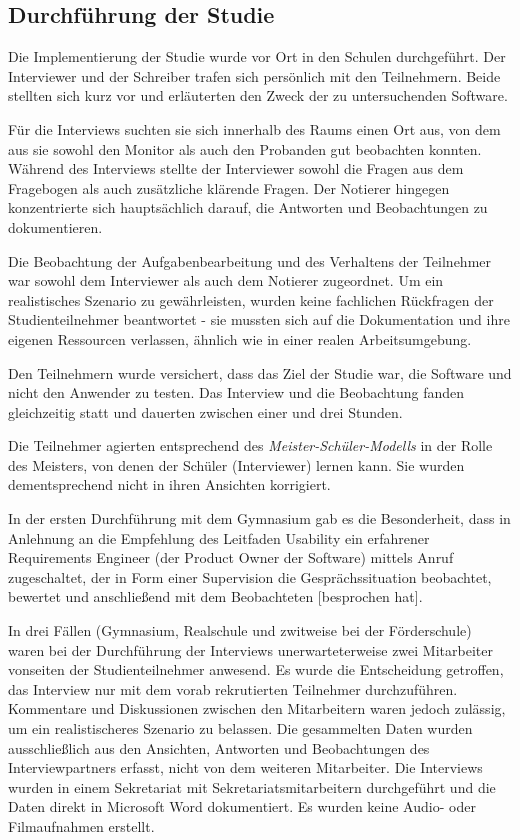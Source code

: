 \subsection{Durchführung der Studie}

Die Implementierung der Studie wurde vor Ort in den Schulen durchgeführt. Der Interviewer und der Schreiber trafen sich persönlich mit den Teilnehmern. Beide stellten sich kurz vor und erläuterten den Zweck der zu untersuchenden Software.

Für die Interviews suchten sie sich innerhalb des Raums einen Ort aus, von dem aus sie sowohl den Monitor als auch den Probanden gut beobachten konnten. Während des Interviews stellte der Interviewer sowohl die Fragen aus dem Fragebogen als auch zusätzliche klärende Fragen. Der Notierer hingegen konzentrierte sich hauptsächlich darauf, die Antworten und Beobachtungen zu dokumentieren.

Die Beobachtung der Aufgabenbearbeitung und des Verhaltens der Teilnehmer war sowohl dem Interviewer als auch dem Notierer zugeordnet. Um ein realistisches Szenario zu gewährleisten, wurden keine fachlichen Rückfragen der Studienteilnehmer beantwortet - sie mussten sich auf die Dokumentation und ihre eigenen Ressourcen verlassen, ähnlich wie in einer realen Arbeitsumgebung.

Den Teilnehmern wurde versichert, dass das Ziel der Studie war, die Software und nicht den Anwender zu testen. Das Interview und die Beobachtung fanden gleichzeitig statt und dauerten zwischen einer und drei Stunden.

Die Teilnehmer agierten entsprechend des \textit{Meister-Schüler-Modells} in der Rolle des Meisters, von denen der Schüler (Interviewer) lernen kann. Sie wurden dementsprechend nicht in ihren Ansichten korrigiert. %

In der ersten Durchführung mit dem Gymnasium gab es die Besonderheit, dass  in Anlehnung an die Empfehlung des Leitfaden Usability ein erfahrener Requirements Engineer (der Product Owner der Software) mittels Anruf zugeschaltet, der \glqq in Form einer Supervision die Gesprächssituation beobachtet, bewertet und anschließend mit dem Beobachteten [besprochen hat]\grqq{}\cite[p.~133]{dakks}.

In drei Fällen (Gymnasium, Realschule und zwitweise bei der Förderschule) waren bei der Durchführung der Interviews unerwarteterweise zwei Mitarbeiter vonseiten der Studienteilnehmer anwesend. Es wurde die Entscheidung getroffen, das Interview nur mit dem vorab rekrutierten Teilnehmer durchzuführen. Kommentare und Diskussionen zwischen den Mitarbeitern waren jedoch zulässig, um ein realistischeres Szenario zu belassen. Die gesammelten Daten wurden ausschließlich aus den Ansichten, Antworten und Beobachtungen des Interviewpartners erfasst, nicht von dem weiteren Mitarbeiter. Die Interviews wurden in einem Sekretariat mit Sekretariatsmitarbeitern durchgeführt und die Daten direkt in Microsoft Word dokumentiert. Es wurden keine Audio- oder Filmaufnahmen erstellt.

